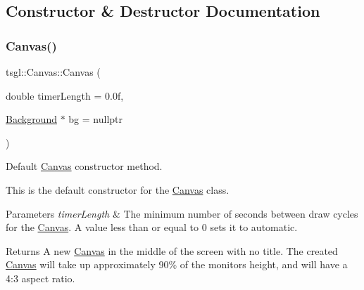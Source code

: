 \subsection{Constructor \& Destructor Documentation}
\mbox{\label{classtsgl_1_1_canvas_a7954ec07ba18f72024b388cdba965015}} 
\subsubsection{\texorpdfstring{Canvas()}{Canvas()}\hspace{0.1cm}{\footnotesize\ttfamily [1/2]}}
{\footnotesize\ttfamily tsgl\+::\+Canvas\+::\+Canvas (\begin{DoxyParamCaption}\item[{double}]{timer\+Length = {\ttfamily 0.0f},  }\item[{\hyperlink{classtsgl_1_1_background}{Background} $\ast$}]{bg = {\ttfamily nullptr} }\end{DoxyParamCaption})}



Default \hyperlink{classtsgl_1_1_canvas}{Canvas} constructor method. 

This is the default constructor for the \hyperlink{classtsgl_1_1_canvas}{Canvas} class. 
\begin{DoxyParams}{Parameters}
{\em timer\+Length} & The minimum number of seconds between draw cycles for the \hyperlink{classtsgl_1_1_canvas}{Canvas}. A value less than or equal to 0 sets it to automatic. \\
\hline
\end{DoxyParams}
\begin{DoxyReturn}{Returns}
A new \hyperlink{classtsgl_1_1_canvas}{Canvas} in the middle of the screen with no title. The created \hyperlink{classtsgl_1_1_canvas}{Canvas} will take up approximately 90\% of the monitor\textquotesingle{}s height, and will have a 4\+:3 aspect ratio. 
\end{DoxyReturn}
\mbox{\label{classtsgl_1_1_canvas_ae1b6c345bb9abbd46a11a6b30975711c}} 
